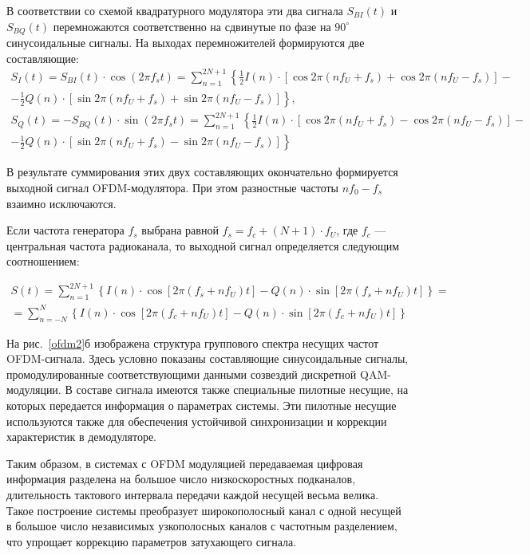 В соответствии со схемой квадратурного модулятора эти два сигнала $S_{BI}(t)$ и $S_{BQ}(t)$ перемножаются соответственно на сдвинутые по фазе на $90^\circ$ синусоидальные сигналы. На выходах перемножителей формируются две составляющие:
\begin{multline}
S_I(t) = S_{BI}(t)\cdot\cos(2\pi f_st) = \sum_{n = 1}^{2N + 1}\left\{\frac{1}{2}I(n)\cdot [\cos2\pi(nf_U + f_s) + \cos2\pi(nf_U - f_s)] - \right.\\
\left.-\frac{1}{2}Q(n)\cdot [\sin2\pi(nf_U + f_s) + \sin2\pi(nf_U - f_s)]\right\},
\end{multline}
\begin{multline}
S_Q(t) = -S_{BQ}(t)\cdot\sin(2\pi f_st) = \sum_{n = 1}^{2N + 1} \left\{\frac{1}{2}I(n)\cdot [\cos2\pi(nf_U + f_s) - \cos2\pi(nf_U - f_s)] - \right.\\
\left.-\frac{1}{2}Q(n)\cdot [\sin2\pi(nf_U + f_s) - \sin2\pi(nf_U - f_s)]\right\}
\end{multline}

В результате суммирования этих двух составляющих окончательно формируется выходной сигнал OFDM-модулятора. При этом разностные частоты $nf_0 - f_s$ взаимно исключаются.

Если частота генератора $f_s$ выбрана равной $f_s = f_c + (N + 1) \cdot f_U$, где $f_c$ --- центральная частота радиоканала, то выходной сигнал определяется следующим соотношением:

\begin{multline}
S(t) = \sum_{n = 1}^{2N + 1} \left\{ I(n)\cdot\cos[2\pi(f_s + nf_U)t] - Q(n)\cdot\sin[2\pi(f_s + nf_U)t] \right\} =\\
=\sum_{n = -N}^N \left\{ I(n)\cdot\cos[2\pi(f_c + nf_U)t] - Q(n)\cdot\sin[2\pi(f_c + nf_U)t] \right\}
\end{multline}

На рис.~\ref{ofdm2}б изображена структура группового спектра несущих частот OFDM-сигнала.
Здесь условно показаны составляющие синусоидальные сигналы, промодулированные соответствующими данными созвездий дискретной QAM-модуляции.
В составе сигнала имеются также специальные пилотные несущие, на которых передается информация о параметрах системы.
Эти пилотные несущие используются также для обеспечения устойчивой синхронизации и коррекции характеристик в демодуляторе.

Таким образом, в системах с OFDM модуляцией передаваемая цифровая информация разделена на большое число низкоскоростных подканалов, длительность тактового интервала передачи каждой несущей весьма велика.
Такое построение системы преобразует широкополосный канал с одной несущей в большое число независимых узкополосных каналов с частотным разделением, что упрощает коррекцию параметров затухающего сигнала.



